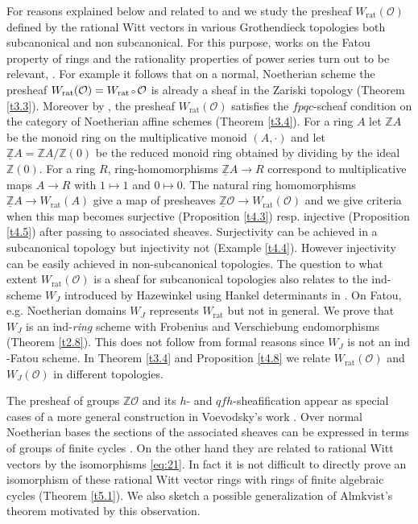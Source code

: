 \documentclass[12pt,leqno]{article}
\newcommand{\Z}{{\mathbb{Z}}}
\newcommand{\uZ}{\underline{\Z}}
\newcommand{\ind}{\mathrm{ind}}
\newcommand{\rat}{\mathrm{rat}}
\newcommand{\Oh}{{\mathcal O}}
\newcommand{\verk}{\mbox{\scriptsize $\,\circ\,$}}
\begin{document}
For reasons explained below and related to \cite{KS} and \cite{D} we study the presheaf $W_{\rat} (\Oh)$ defined by the rational Witt vectors in various Grothendieck topologies both subcanonical and non subcanonical. For this purpose, works on the Fatou property of rings and the rationality properties of power series turn out to be relevant, \cite{B, CC, C1, H}. For example it follows that on a normal, Noetherian scheme the presheaf $W_{\rat} (\Oh) = W_{\rat} \verk \Oh$ is already a sheaf in the Zariski topology (Theorem \ref{t3.3}). Moreover by \cite{Sch}, the presheaf $W_{\rat} (\Oh)$ satisfies the $fpqc$-scheaf condition on the category of Noetherian affine schemes (Theorem \ref{t3.4}). For a ring $A$ let $\Z A$ be the monoid ring on the multiplicative monoid $(A , \cdot)$ and let $\uZ A = \Z A / \Z (0)$ be the reduced monoid ring obtained by dividing by the ideal $\Z (0)$. For a ring $R$, ring-homomorphisms $\uZ A \to R$ correspond to multiplicative maps $A \to R$ with $1 \mapsto 1$ and $0 \mapsto 0$. The natural ring homomorphisms $\uZ A \to W_{\rat} (A)$ give a map of presheaves $\uZ \Oh \to W_{\rat} (\Oh)$ and we give criteria when this map becomes surjective (Proposition \ref{t4.3}) resp. injective (Proposition \ref{t4.5}) after passing to associated sheaves. Surjectivity can be achieved in a subcanonical topology but injectivity not (Example \ref{t4.4}). However injectivity can be easily achieved in non-subcanonical topologies. The question to what extent $W_{\rat} (\Oh)$ is a sheaf for subcanonical topologies also relates to the $\ind$-scheme $W_J$ introduced by Hazewinkel using Hankel determinants in \cite{H}. On Fatou, e.g. Noetherian domains $W_J$ represents $W_{\rat}$ but not in general. We prove that $W_J$ is an $\ind$-{\it ring} scheme with Frobenius and Verschiebung endomorphisms (Theorem \ref{t2.8}). This does not follow from formal reasons since $W_J$ is not an $\ind$-Fatou scheme. In Theorem \ref{t3.4} and Proposition \ref{t4.8} we relate $W_{\rat} (\Oh)$ and $W_J (\Oh)$ in different topologies. 

The presheaf of groups $\Z \Oh$ and its $h$- and $qfh$-sheafification appear as special cases of a more general construction in Voevodsky's work \cite{V}. Over normal Noetherian bases the sections of the associated sheaves can be expressed in terms of groups of finite cycles \cite[\S\,6]{SV1}. On the other hand they are related to rational Witt vectors by the isomorphisms \eqref{eq:21}. In fact it is not difficult to directly prove an isomorphism of these rational Witt vector rings with rings of finite algebraic cycles (Theorem \ref{t5.1}). We also sketch a possible generalization of Almkvist's theorem motivated by this observation. 
\end{document}
